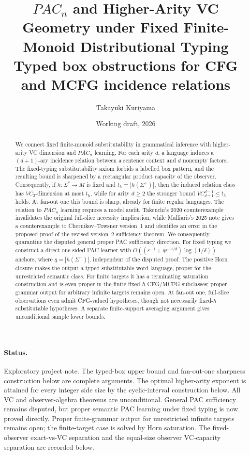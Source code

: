 \documentclass[11pt]{article}
\title{\(PAC_n\) and Higher-Arity VC Geometry under Fixed Finite-Monoid Distributional Typing\\
\large Typed box obstructions for CFG and MCFG incidence relations}
\author{Takayuki Kuriyama}
\date{Working draft, 2026}
\newcommand{\eps}{\varepsilon}
\begin{document}
\maketitle

\begin{abstract}
We connect fixed finite-monoid substitutability in grammatical inference with higher-arity VC dimension and \(PAC_n\) learning. For each arity \(d\), a language induces a \((d+1)\)-ary incidence relation between a sentence context and \(d\) nonempty factors. The fixed-typing substitutability axiom forbids a labelled box pattern, and the resulting bound is sharpened by a rectangular product capacity of the observer. Consequently, if \(h:\Sigma^*\to M\) is fixed and \(t_h=|h(\Sigma^+)|\), then the induced relation class has \(VC_2\)-dimension at most \(t_h\), while for arity \(d\ge2\) the stronger bound \(VC_{d+1}^{d-1}\le t_h\) holds. At fan-out one this bound is sharp, already for finite regular languages. The relation to \(PAC_n\) learning requires a model audit. Takeuchi's 2020 counterexample invalidates the original full-slice necessity implication, while Malliaris's 2025 note gives a counterexample to Chernikov--Towsner version~1 and identifies an error in the proposed proof of the revised version~2 sufficiency theorem. We consequently quarantine the disputed general proper PAC sufficiency direction. For fixed typing we construct a direct one-sided PAC learner with \(O((\eps^{-1}+q\eps^{-1/d})\log(1/\delta))\) anchors, where \(q=|h(\Sigma^+)|\), independent of the disputed proof. The positive Horn closure makes the output a typed-substitutable word-language, proper for the unrestricted semantic class. For finite targets it has a terminating saturation construction and is even proper in the finite fixed-\(h\) CFG/MCFG subclasses; proper grammar output for arbitrary infinite targets remains open. At fan-out one, full-slice observations even admit CFG-valued hypotheses, though not necessarily fixed-\(h\) substitutable hypotheses. A separate finite-support averaging argument gives unconditional sample lower bounds.
\end{abstract}

\paragraph{Status.}
Exploratory project note. The typed-box upper bound and fan-out-one sharpness construction below are complete arguments. The optimal higher-arity exponent is attained for every integer side size by the cyclic-interval construction below. All VC and observer-algebra theorems are unconditional. General PAC sufficiency remains disputed, but proper semantic PAC learning under fixed typing is now proved directly. Proper finite-grammar output for unrestricted infinite targets remains open; the finite-target case is solved by Horn saturation. The fixed-observer exact-vs-VC separation and the equal-size observer VC-capacity separation are recorded below.
\end{document}
